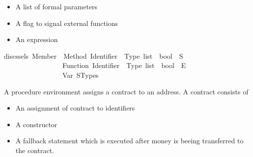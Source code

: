 \begin{isabellebody}
\begin{isamarkuptext}
%
\begin{itemize}%
\item A list of formal parameters

\item A flag to signal external functions

\item An expression%
\end{itemize}%
\end{isamarkuptext}\isamarkuptrue%
\isamarkupfalse%
{\isacharparenleft}{\kern0pt}discs{\isacharunderscore}{\kern0pt}sels{\isacharparenright}{\kern0pt}\ Member\ {\isacharequal}{\kern0pt}\ Method\ {\isachardoublequoteopen}{\isacharparenleft}{\kern0pt}Identifier\ {\isasymtimes}\ Type{\isacharparenright}{\kern0pt}\ list\ {\isasymtimes}\ bool\ {\isasymtimes}\ S{\isachardoublequoteclose}\isanewline
\ \ \ \ \ \ \ \ \ \ \ \ \ \ \ \ {\isacharbar}{\kern0pt}\ Function\ {\isachardoublequoteopen}{\isacharparenleft}{\kern0pt}Identifier\ {\isasymtimes}\ Type{\isacharparenright}{\kern0pt}\ list\ {\isasymtimes}\ bool\ {\isasymtimes}\ E{\isachardoublequoteclose}\isanewline
\ \ \ \ \ \ \ \ \ \ \ \ \ \ \ \ {\isacharbar}{\kern0pt}\ Var\ STypes%
\begin{isamarkuptext}%
A procedure environment assigns a contract to an address.
A contract consists of

%
\begin{itemize}%
\item An assignment of contract to identifiers

\item A constructor

\item A fallback statement which is executed after money is beeing transferred to the contract.


\end{itemize}
\end{isamarkuptext}
\end{isabellebody}
